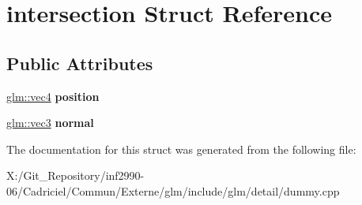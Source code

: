 \hypertarget{structintersection}{\section{intersection Struct Reference}
\label{structintersection}
}
\subsection*{Public Attributes}
\begin{DoxyCompactItemize}
\item 
\hypertarget{structintersection_a7a33f425d759e3e1240499a7f527b914}{\hyperlink{group__core__types_ga5881b1b022d7fd1b7218f5916532dd02}{glm\-::vec4} {\bfseries position}}\label{structintersection_a7a33f425d759e3e1240499a7f527b914}

\item 
\hypertarget{structintersection_a4db60aeaf032905a89ca8382914b44e4}{\hyperlink{group__core__types_ga1c47e8b3386109bc992b6c48e91b0be7}{glm\-::vec3} {\bfseries normal}}\label{structintersection_a4db60aeaf032905a89ca8382914b44e4}

\end{DoxyCompactItemize}


The documentation for this struct was generated from the following file\-:\begin{DoxyCompactItemize}
\item 
X\-:/\-Git\-\_\-\-Repository/inf2990-\/06/\-Cadriciel/\-Commun/\-Externe/glm/include/glm/detail/dummy.\-cpp\end{DoxyCompactItemize}
